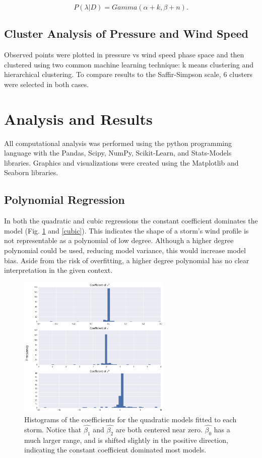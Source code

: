 \documentclass{article}
\begin{document}
		\begin{equation}
			P(\lambda | D) = Gamma(\alpha + k, \beta + n).
		\end{equation}
		

	\subsection{Cluster Analysis of Pressure and Wind Speed}
	Observed points were plotted in pressure vs wind speed phase space and then clustered using two common machine learning technique: k means clustering and hierarchical clustering. To compare results to the Saffir-Simpson scale\cite{}, 6 clusters were selected in both cases.

	\section{Analysis and Results}
		 All computational analysis was performed using the python programming language with the Pandas, Scipy, NumPy, Scikit-Learn, and Stats-Models libraries\cite{mckinney2010data, scipy, walt2011numpy, scikit-learn, statsmodels2010}. Graphics and visualizations were created using the Matplotlib and Seaborn libraries\cite{hunter2007matplotlib, michael_waskom_2014_12710}.
		 
	\subsection{Polynomial Regression}
	In both the quadratic and cubic regressions the constant coefficient dominates the model (Fig. \ref{quadratic} and \ref{cubic}). This indicates the shape of a storm's wind profile is not representable as a polynomial of low degree. Although a higher degree polynomial could be used, reducing model variance, this would increase model bias. Aside from the risk of overfitting, a higher degree polynomial has no clear interpretation in the given context.

	\begin{figure}[h]
			\centering
			\includegraphics[width=0.65\textwidth]{images/quadratic.png}
		\caption{Histograms of the coefficients for the quadratic models fitted to each storm. Notice that $\hat{\beta_1}$ and $\hat{\beta_2}$ are both centered near zero. $\hat{\beta_0}$ has a much larger range, and is shifted slightly in the positive direction, indicating the constant coefficient dominated most models.}
		\label{quadratic}
	\end{figure}
	
\end{document}
